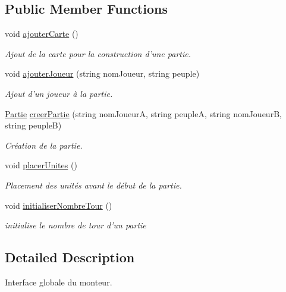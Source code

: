 \subsection*{Public Member Functions}
\begin{DoxyCompactItemize}
\item 
void \hyperlink{interface_small_world_1_1_inter_monteur_partie_a473c91ad26ee485f07261df1fcae0e8b}{ajouter\-Carte} ()
\begin{DoxyCompactList}\small\item\em Ajout de la carte pour la construction d'une partie. \end{DoxyCompactList}\item 
void \hyperlink{interface_small_world_1_1_inter_monteur_partie_ae52498262dd36230b0c0d090cb59ff07}{ajouter\-Joueur} (string nom\-Joueur, string peuple)
\begin{DoxyCompactList}\small\item\em Ajout d'un joueur à la partie. \end{DoxyCompactList}\item 
\hyperlink{class_small_world_1_1_partie}{Partie} \hyperlink{interface_small_world_1_1_inter_monteur_partie_ad471ab6610aaa1664fb3d0bd93f00be3}{creer\-Partie} (string nom\-Joueur\-A, string peuple\-A, string nom\-Joueur\-B, string peuple\-B)
\begin{DoxyCompactList}\small\item\em Création de la partie. \end{DoxyCompactList}\item 
void \hyperlink{interface_small_world_1_1_inter_monteur_partie_a4ea7442b592d23a0f31e0d0020f124de}{placer\-Unites} ()
\begin{DoxyCompactList}\small\item\em Placement des unités avant le début de la partie. \end{DoxyCompactList}\item 
void \hyperlink{interface_small_world_1_1_inter_monteur_partie_afa1b718338a15b4dd0deb5d817f3484c}{initialiser\-Nombre\-Tour} ()
\begin{DoxyCompactList}\small\item\em initialise le nombre de tour d'un partie \end{DoxyCompactList}\end{DoxyCompactItemize}


\subsection{Detailed Description}
Interface globale du monteur. 

